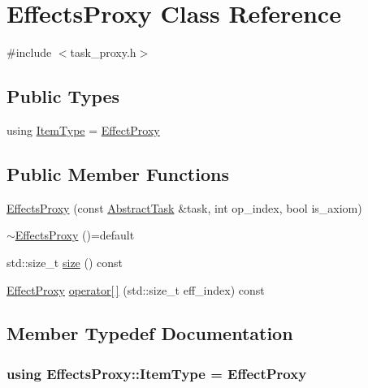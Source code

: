 \hypertarget{classEffectsProxy}{\section{Effects\-Proxy Class Reference}
\label{classEffectsProxy}
}


{\ttfamily \#include $<$task\-\_\-proxy.\-h$>$}

\subsection*{Public Types}
\begin{DoxyCompactItemize}
\item 
using \hyperlink{classEffectsProxy_a7cafa2192ee2e829a7479129e871e7eb}{Item\-Type} = \hyperlink{classEffectProxy}{Effect\-Proxy}
\end{DoxyCompactItemize}
\subsection*{Public Member Functions}
\begin{DoxyCompactItemize}
\item 
\hyperlink{classEffectsProxy_a12d9791a9bd90df7f0fb1efb1c800782}{Effects\-Proxy} (const \hyperlink{classAbstractTask}{Abstract\-Task} \&task, int op\-\_\-index, bool is\-\_\-axiom)
\item 
\hyperlink{classEffectsProxy_a55c03d1012518ca3ac7c55757c3d66dc}{$\sim$\-Effects\-Proxy} ()=default
\item 
std\-::size\-\_\-t \hyperlink{classEffectsProxy_ab153e05e58aef798690cd76d565aaaf9}{size} () const 
\item 
\hyperlink{classEffectProxy}{Effect\-Proxy} \hyperlink{classEffectsProxy_a462603bb0a8f8ca8b6bbfc6d4517f6a9}{operator\mbox{[}$\,$\mbox{]}} (std\-::size\-\_\-t eff\-\_\-index) const 
\end{DoxyCompactItemize}


\subsection{Member Typedef Documentation}
\hypertarget{classEffectsProxy_a7cafa2192ee2e829a7479129e871e7eb}{
\subsubsection[{Item\-Type}]{\setlength{\rightskip}{0pt plus 5cm}using {\bf Effects\-Proxy\-::\-Item\-Type} =  {\bf Effect\-Proxy}}}\label{classEffectsProxy_a7cafa2192ee2e829a7479129e871e7eb}



